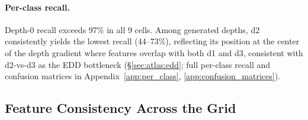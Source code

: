 \begin{table}[t]
\centering
\small
\caption{Four-class RF accuracy (\%) with bootstrap 95\% confidence interval (CI; ${\pm}$half-width; $B{=}10{,}000$). RF with 200 trees, evaluated via 5-fold stratified CV (seed=42). Parenthesized: d1--d3 balanced accuracy from the same 4-class RF (chance = 25\% / 33\%). Depth-0 recall exceeds 97\% in all cells. Within-distribution ordinal quality: mean absolute error (MAE)\,=\,0.23, QWK\,=\,0.89 (QWK$_{\text{d1--d3}}$\,=\,0.74); 98.2\% of errors fall on adjacent depths ($|\Delta| \leq 1$). $^\dagger$Self-reference scoring (Pythia-1.4B is both generator and reference model); 4--11\,pp advantage over cross-model references (Appendix~\ref{app:ref_ablation}). Cross-cell comparisons involving Pythia should be interpreted with this caveat.}
\label{tab:main_matrix}
\end{table}

\paragraph{Per-class recall.}
Depth-0 recall exceeds 97\% in all 9 cells.
Among generated depths, d2 consistently yields the lowest recall (44--73\%), reflecting its position at the center of the depth gradient where features overlap with both d1 and d3, consistent with d2-vs-d3 as the EDD bottleneck (\S\ref{sec:atlas:edd}; full per-class recall and confusion matrices in Appendix~\ref{app:per_class}, \ref{app:confusion_matrices}).

\subsection{Feature Consistency Across the Grid}
\label{sec:atlas:features}

